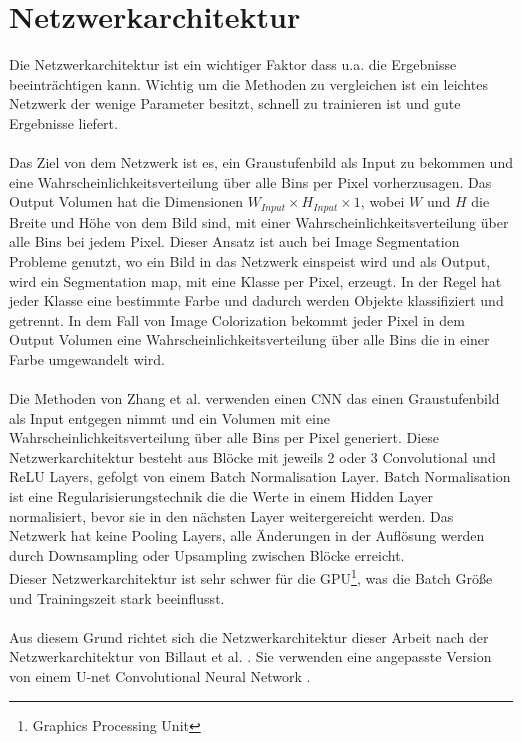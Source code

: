 \section{Netzwerkarchitektur}
Die Netzwerkarchitektur ist ein wichtiger Faktor dass u.a. die Ergebnisse beeinträchtigen kann. Wichtig um die Methoden zu vergleichen ist ein
leichtes Netzwerk der wenige Parameter besitzt, schnell zu trainieren ist und gute Ergebnisse liefert.
\\
\\
Das Ziel von dem Netzwerk ist es, ein Graustufenbild als Input zu bekommen und eine Wahrscheinlichkeitsverteilung über alle Bins per Pixel vorherzusagen.
Das Output Volumen hat die Dimensionen $ W_{Input} \times H_{Input} \times 1 $, wobei $W$ und $H$ die Breite und Höhe von dem Bild sind,
mit einer Wahrscheinlichkeitsverteilung über alle Bins bei jedem Pixel. Dieser Ansatz ist auch bei Image Segmentation Probleme genutzt, wo ein Bild
in das Netzwerk einspeist wird und als Output, wird ein Segmentation map, mit eine Klasse per Pixel, erzeugt. In der Regel hat jeder Klasse eine
bestimmte Farbe und dadurch werden Objekte klassifiziert und getrennt. In dem Fall von Image Colorization bekommt jeder Pixel in dem Output Volumen
eine Wahrscheinlichkeitsverteilung über alle Bins die in einer Farbe umgewandelt wird.
\\
\\
Die Methoden von Zhang et al. \cite{zhang2016colorful} verwenden einen \gls{CNN} das einen Graustufenbild als Input entgegen nimmt und ein Volumen mit
eine Wahrscheinlichkeitsverteilung über alle Bins per Pixel generiert. Diese Netzwerkarchitektur besteht aus Blöcke mit jeweils 2 oder 3 Convolutional
und ReLU Layers, gefolgt von einem Batch Normalisation Layer. Batch Normalisation ist eine Regularisierungstechnik die die Werte in einem Hidden Layer
normalisiert, bevor sie in den nächsten Layer weitergereicht werden. Das Netzwerk hat keine Pooling Layers, alle Änderungen in der Auflösung werden durch
Downsampling oder Upsampling zwischen Blöcke erreicht.
\\
Dieser Netzwerkarchitektur ist sehr schwer für die GPU\footnote{Graphics Processing Unit}, was die Batch Größe und Trainingszeit stark beeinflusst.
\\
\\
Aus diesem Grund richtet sich die Netzwerkarchitektur dieser Arbeit nach der Netzwerkarchitektur von Billaut et al. \cite{billaut2018colorunet}. 
Sie verwenden eine angepasste Version von einem U-net Convolutional Neural Network \cite{ronneberger2015unet}. 


